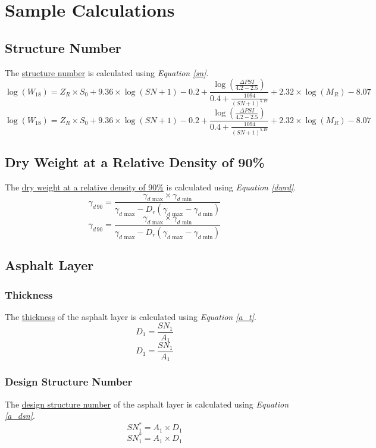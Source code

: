 \documentclass{article}
\begin{document}
\section{Sample Calculations}
\subsection{Structure Number}
\noindent The \underline{structure number} is calculated using \emph{Equation \ref{sn}}.
\begin{equation}\label{sn}\log(W_{18})=Z_R\times S_0+9.36\times\log(SN+1)-0.2+\frac{\log\left(\frac{\Delta PSI}{4.2-2.5}\right)}{0.4+\frac{1094}{(SN+1)^{5.19}}}+2.32\times\log(M_R)-8.07\end{equation}
\[\log(W_{18})=Z_R\times S_0+9.36\times\log(SN+1)-0.2+\frac{\log\left(\frac{\Delta PSI}{4.2-2.5}\right)}{0.4+\frac{1094}{(SN+1)^{5.19}}}+2.32\times\log(M_R)-8.07\]
\subsection{Dry Weight at a Relative Density of 90\%}
\noindent The \underline{dry weight at a relative density of 90\%} is calculated using \emph{Equation \ref{dwrd}}.
\begin{equation}\label{dwrd}\gamma_{d\,90}=\frac{\gamma_{d\text{ max}}\times \gamma_{d\text{ min}}}{\gamma_{d\text{ max}}-D_r(\gamma_{d\text{ max}}-\gamma_{d\text{ min}})}\end{equation}
\[\gamma_{d\,90}=\frac{\gamma_{d\text{ max}}\times \gamma_{d\text{ min}}}{\gamma_{d\text{ max}}-D_r(\gamma_{d\text{ max}}-\gamma_{d\text{ min}})}\]
\subsection{Asphalt Layer}
\subsubsection{Thickness}
\noindent The \underline{thickness} of the asphalt layer is calculated using \emph{Equation \ref{a_t}}.
\begin{equation}\label{a_t}D_1=\frac{SN_1}{A_1}\end{equation}
\[D_1=\frac{SN_1}{A_1}\]
\subsubsection{Design Structure Number} 
\noindent The \underline{design structure number} of the asphalt layer is calculated using \emph{Equation \ref{a_dsn}}.
\begin{equation}\label{a_dsn}SN_1^*=A_1\times D_1\end{equation}
\[SN_1^*=A_1\times D_1\]
\end{document}
